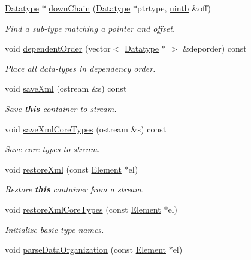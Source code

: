 \begin{DoxyCompactItemize}
\mbox{\hyperlink{class_datatype}{Datatype}} $\ast$ \mbox{\hyperlink{class_type_factory_a979852b4d0b186f833d16d4638fe6f08}{down\+Chain}} (\mbox{\hyperlink{class_datatype}{Datatype}} $\ast$ptrtype, \mbox{\hyperlink{types_8h_a2db313c5d32a12b01d26ac9b3bca178f}{uintb}} \&off)
\begin{DoxyCompactList}\small\item\em Find a sub-\/type matching a pointer and offset. \end{DoxyCompactList}\item 
void \mbox{\hyperlink{class_type_factory_ab143d57ae08682ff4fbc28a6ace5a54e}{dependent\+Order}} (vector$<$ \mbox{\hyperlink{class_datatype}{Datatype}} $\ast$ $>$ \&deporder) const
\begin{DoxyCompactList}\small\item\em Place all data-\/types in dependency order. \end{DoxyCompactList}\item 
void \mbox{\hyperlink{class_type_factory_adf9b9838cfe8166a236de6562f6dfcc3}{save\+Xml}} (ostream \&s) const
\begin{DoxyCompactList}\small\item\em Save {\bfseries{this}} container to stream. \end{DoxyCompactList}\item 
void \mbox{\hyperlink{class_type_factory_a1caebbe3620eee3ba78427608b1126dd}{save\+Xml\+Core\+Types}} (ostream \&s) const
\begin{DoxyCompactList}\small\item\em Save core types to stream. \end{DoxyCompactList}\item 
void \mbox{\hyperlink{class_type_factory_af9a16d80bfd84732a8dca11ed4a23fab}{restore\+Xml}} (const \mbox{\hyperlink{class_element}{Element}} $\ast$el)
\begin{DoxyCompactList}\small\item\em Restore {\bfseries{this}} container from a stream. \end{DoxyCompactList}\item 
void \mbox{\hyperlink{class_type_factory_a24c7308dab804e4f89fd567500b97d63}{restore\+Xml\+Core\+Types}} (const \mbox{\hyperlink{class_element}{Element}} $\ast$el)
\begin{DoxyCompactList}\small\item\em Initialize basic type names. \end{DoxyCompactList}\item 
void \mbox{\hyperlink{class_type_factory_a6e13c732148b6c5f78797d60e1a115f5}{parse\+Data\+Organization}} (const \mbox{\hyperlink{class_element}{Element}} $\ast$el)

\end{DoxyCompactItemize}
